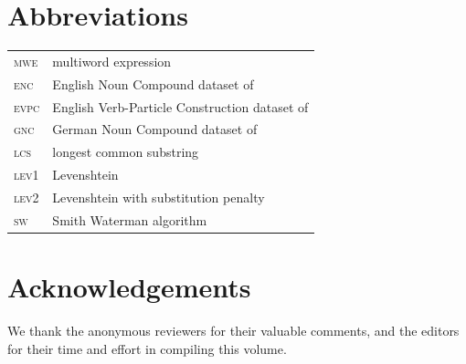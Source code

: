 \documentclass[output=paper
,modfonts
,nonflat]{langsci/langscibook}
\begin{document}
\section*{Abbreviations}

\begin{tabularx}{.48\textwidth}{ll}
   \textsc{mwe} & multiword expression  \\
  \textsc{enc} &  English Noun Compound dataset of \citet{reddy2011a}  \\
\textsc{evpc} &  English Verb-Particle Construction dataset of \citet{bannard2003}  \\
\textsc{gnc}  &  German Noun Compound dataset of \citet{SchulteImWalde+:2013} \\
 \textsc{lcs} &   longest common substring  \\
  \textsc{lev1} &  Levenshtein  \\
  \textsc{lev2} &  Levenshtein with substitution penalty \\
 \textsc{sw}  & Smith Waterman algorithm  \\
  \end{tabularx}


\section*{Acknowledgements}
We thank the anonymous reviewers for their valuable
comments, and the editors for their time and effort in compiling
this volume.

{\sloppy
\printbibliography[heading=subbibliography,notkeyword=this]
}
\end{document}
